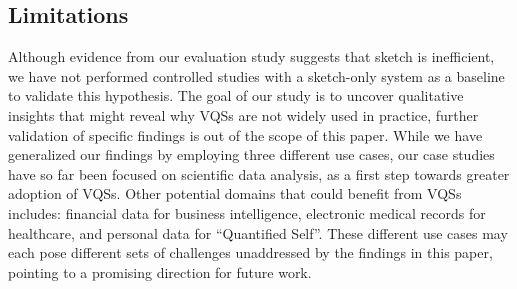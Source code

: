 \subsection{Limitations}
\par Although evidence from our evaluation study suggests that sketch is inefficient, we have not performed controlled studies with a sketch-only system as a baseline to validate this hypothesis. The goal of our study is to uncover qualitative insights that might reveal why VQSs are not widely used in practice, further validation of specific findings is out of the scope of this paper. While we have generalized our findings by employing three different use cases, our case studies have so far been focused on scientific data analysis, as a first step towards greater adoption of VQSs. Other potential domains that could benefit from VQSs includes: financial data for business intelligence, electronic medical records for healthcare, and personal data for ``Quantified Self''. These different use cases may each pose different sets of challenges unaddressed by the findings in this paper, pointing to a promising direction for future work. 
